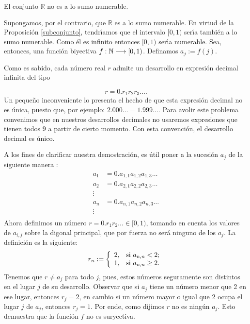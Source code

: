 \begin{teorema}\label{realnonum} El conjunto $\mathbb{R}$ no es
a lo sumo numerable.
\end{teorema}
\begin{demo} Supongamos, por el contrario, que $\mathbb{R}$ es a
lo sumo numerable. En virtud de la Proposici\'on
\vref{subconjunto}, tendr\'{\i}amos que el intervalo $[0,1)$
ser\'{\i}a tambi\'en a lo sumo numerable. Como \'el es infinito
entonces $[0,1)$ ser\'{\i}a numerable. Sea, entonces, una
funci\'on biyectiva $f:\nn\longrightarrow [0,1)$. Definamos
$a_j:=f(j)$.

Como es sabido, cada n\'umero real $r$ admite un desarrollo en
expresi\'on decimal infinita del tipo

\[r=0.r_1r_2r_3\dots.\]
Un peque\~no inconveniente lo presenta el hecho de que esta
expresi\'on decimal no es \'unica, puesto que, por ejemplo:
$2.000\dots=1.999\dots$. Para avolir este problema convenimos que
en nuestros desarrollos decimales no usaremos expresiones que
tienen todos $9$ a partir de cierto momento. Con esta
convenci\'on, el desarrollo decimal es \'unico.

A los fines de clarificar nuestra demostraci\'on, es \'util poner
a la sucesi\'on $a_j$ de la siguiente manera :
\[\begin{split}
a_1&=0.a_{1,1}a_{1,2}a_{1,3}\dots\\
a_2&=0.a_{2,1}a_{2,2}a_{2,3}\dots\\
\vdots&\\
a_n&=0.a_{n,1}a_{n,2}a_{n,3}\dots\\
 \vdots&\\
 \end{split}\]
Ahora definimos un n\'umero $r=0.r_1r_2\dots\in[0,1)$, tomando en
cuenta los valores de $a_{i,j}$ sobre la digonal principal, que
por fuerza no ser\'a ninguno de los $a_j$. La definici\'on es la
siguiente:
\[r_n:=\left\{
\begin{array}{ll}
    2, & \hbox{si $a_{n,n}<2$;} \\
    1, & \hbox{si $a_{n,n}\geq 2$.} \\
\end{array}
\right.
\]
Tenemos que $r\neq a_j$ para todo $j$, pues, estos n\'umeros
seguramente son distintos en el lugar $j$ de su desarrollo.
Observar que si $a_j$ tiene un n\'umero menor que 2 en ese lugar,
entonces $r_j=2$, en cambio si un n\'umero mayor o igual que 2
ocupa el lugar $j$ de $a_j$, entonces $r_j=1$. Por ende, como
dijimos $r$ no es ning\'un $a_j$. Esto demuestra que la funci\'on
$f$ no es suryectiva.
\end{demo}

